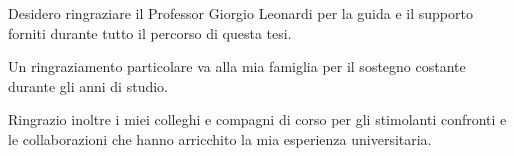 
Desidero ringraziare il Professor Giorgio Leonardi per la guida e il supporto forniti durante tutto il percorso di questa tesi.

Un ringraziamento particolare va alla mia famiglia per il sostegno costante durante gli anni di studio.

Ringrazio inoltre i miei colleghi e compagni di corso per gli stimolanti confronti e le collaborazioni che hanno arricchito la mia esperienza universitaria.
